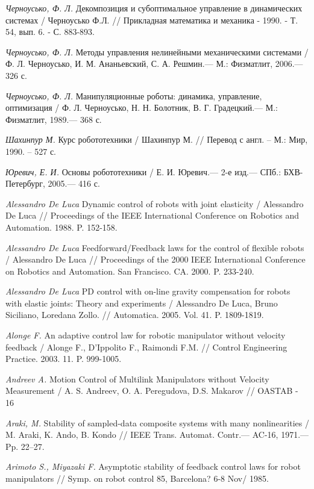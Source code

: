 \begin{thebibliography}{10}
	{\it Черноусько, Ф. Л.} Декомпозиция и субоптимальное управление в динамических системах / Черноусько Ф.Л. // Прикладная математика и механика - 1990. - Т. 54, вып. 6. - С. 883-893.

	{\it Черноусько, Ф. Л.} Методы управления нелинейными механическими системами /
	Ф. Л. Черноусько, И. М. Ананьевский, С. А. Решмин.— М.: Физматлит, 2006.— 326 с.
	
	{\it Черноусько, Ф. Л.} Манипуляционные роботы: динамика, управление, оптимизация /
	Ф. Л. Черноусько, Н. Н. Болотник, В. Г. Градецкий.— М.: Физматлит, 1989.— 368 с.

	
	{\it Шахинпур М.} Курс робототехники / Шахинпур М. // Перевод с англ. – М.: Мир, 1990. – 527 с. 
	
	{\it Юревич, Е. И.} Основы робототехники / Е. И. Юревич.— 2-е изд.— СПб.:
	БХВ-Петербург, 2005.— 416 с.

	{\it Alessandro De Luca} Dynamic control of robots with joint elasticity / Alessandro De Luca // Proceedings of the IEEE
	International Conference on Robotics and Automation. 1988. P. 152-158.

	{\it Alessandro De Luca} Feedforward/Feedback laws for the control of flexible robots / Alessandro De Luca //
	Proceedings of the 2000 IEEE International Conference on Robotics and Automation. San Francisco. CA.
	2000. P. 233-240.
	
	{\it Alessandro De Luca} PD control with on-line gravity compensation for robots with elastic joints: Theory and experiments / Alessandro De 		Luca, Bruno Siciliano, Loredana Zollo. // Automatica. 2005. Vol. 41. P. 1809-1819.
	
	{\it Alonge F.} An adaptive control law for robotic manipulator without velocity feedback / Alonge F., D’Ippolito F., Raimondi F.M. // Control 		Engineering Practice. 2003. 11. P. 999-1005.

	{\it Andreev A.} Motion Control of Multilink Manipulators without Velocity Measurement / A. S. Andreev, O. A. Peregudova, D.S. Makarov // OASTAB 	- 16
	
	{\it Araki, M.} Stability of sampled-data composite systems with many nonlinearities / M. Araki, K. Ando, B. Kondo // IEEE Trans. Automat. 		Contr.— AC-16, 1971.— Pp. 22–27.
	
	{\it Arimoto S., Miyazaki F.} Asymptotic stability of feedback control laws for robot manipulators // Symp. on robot control 85, Barcelona? 6-8 Nov/ 1985.


\end{thebibliography}
